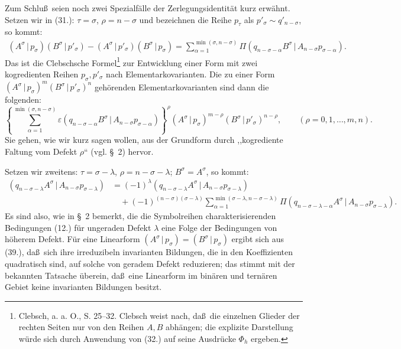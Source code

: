 \documentclass[11pt]{article}
\providecommand{\pair}[2]{(#1\,|\,#2)}
\providecommand{\eps}{\varepsilon}
\begin{document}
Zum Schlu\ss\ seien noch zwei Spezialf\"alle der Zerlegungsidentit\"at kurz erw\"ahnt. Setzen wir in (31.): $\tau=\sigma$, $\rho=n-\sigma$ und bezeichnen die Reihe $p_\tau$ als $p'_\sigma\sim q'_{n-\sigma}$, so kommt:
\begin{equation}
\begin{aligned}
\pair{A^\sigma}{p_\sigma}\pair{B^\sigma}{p'_\sigma}
-\pair{A^\sigma}{p'_\sigma}\pair{B^\sigma}{p_\sigma}
=\sum_{\alpha=1}^{\min(\sigma,n-\sigma)}
\Pi\pair{q_{n-\sigma-\alpha}B^\sigma}{A_{n-\sigma}p_{\sigma-\alpha}}.
\end{aligned}
\tag{37}
\end{equation}
Das ist die Clebschsche Formel\footnote{Clebsch, a. a. O., S. 25--32. Clebsch weist nach, da\ss\ die einzelnen Glieder der rechten Seiten nur von den Reihen $A,B$ abh\"angen; die explizite Darstellung w\"urde sich durch Anwendung von (32.) auf seine Ausdr\"ucke $\Phi_h$ ergeben.} zur Entwicklung einer Form mit zwei kogredienten Reihen $p_\sigma,p'_\sigma$ nach Elementarkovarianten. Die zu einer Form $\pair{A^\sigma}{p_\sigma}^m\pair{B^\sigma}{p'_\sigma}^n$ geh\"orenden Elementarkovarianten sind dann die folgenden:
\begin{equation}
 \left\{\sum_{\alpha=1}^{\min(\sigma,n-\sigma)}
 \eps\pair{q_{n-\sigma-\alpha}B^\sigma}{A_{n-\sigma}p_{\sigma-\alpha}}
 \right\}^{\rho}
 \pair{A^\sigma}{p_\sigma}^{m-\rho}\pair{B^\sigma}{p'_\sigma}^{n-\rho},
 \qquad (\rho=0,1,\ldots,m,n).
\tag{38}
\end{equation}
Sie gehen, wie wir kurz sagen wollen, aus der Grundform durch ,,kogrediente Faltung vom Defekt $\rho$`` (vgl. \S\ 2) hervor.

Setzen wir zweitens: $\tau=\sigma-\lambda$, $\rho=n-\sigma-\lambda$; $B^\sigma=A^\sigma$, so kommt:
\begin{equation}
\begin{aligned}
\pair{q_{n-\sigma-\lambda}A^\sigma}{A_{n-\sigma}p_{\sigma-\lambda}}
&=(-1)^\lambda\pair{q_{n-\sigma-\lambda}A^\sigma}{A_{n-\sigma}p_{\sigma-\lambda}}\\
&\quad+(-1)^{(n-\sigma)(\sigma-\lambda)}
 \sum_{\alpha=1}^{\min(\sigma-\lambda,n-\sigma-\lambda)}
 \Pi\pair{q_{n-\sigma-\lambda-\alpha}A^\sigma}{A_{n-\sigma}p_{\sigma-\lambda}}.
\end{aligned}
\tag{39}
\end{equation}
Es sind also, wie in \S\ 2 bemerkt, die die Symbolreihen charakterisierenden Bedingungen (12.) f\"ur ungeraden Defekt $\lambda$ eine Folge der Bedingungen von h\"oherem Defekt. F\"ur eine Linearform $\pair{A^\sigma}{p_\sigma}=\pair{B^\sigma}{p_\sigma}$ ergibt sich aus (39.), da\ss\ sich ihre irreduzibeln invarianten Bildungen, die in den Koeffizienten quadratisch sind, auf solche von geradem Defekt reduzieren; das stimmt mit der bekannten Tatsache \"uberein, da\ss\ eine Linearform im bin\"aren und tern\"aren Gebiet keine invarianten Bildungen besitzt.
\end{document}
